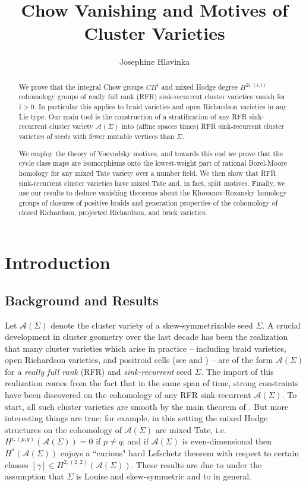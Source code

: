 \documentclass[11pt]{amsart}
\title{Chow Vanishing and Motives of Cluster Varieties}
\author{Josephine Hlavinka}
\theoremstyle{definition}
\theoremstyle{remark}
\numberwithin{equation}{section}
\begin{document}
    \begin{abstract}
    We prove that the integral Chow groups $CH^i$ and mixed Hodge degree $H^{2i, (i, i)}$ cohomology groups of really full rank (RFR) sink-recurrent cluster varieties vanish for $i > 0$. In particular this applies to braid varieties and open Richardson varieties in any Lie type. Our main tool is the construction of a stratification of any RFR sink-recurrent cluster variety $\mathcal{A}(\Sigma)$ into (affine spaces times) RFR sink-recurrent cluster varieties of seeds with fewer mutable vertices than $\Sigma$.
    
    We employ the theory of Voevodsky motives, and towards this end we prove that the cycle class maps are isomorphisms onto the lowest-weight part of rational Borel-Moore homology for any mixed Tate variety over a number field. We then show that RFR sink-recurrent cluster varieties have mixed Tate and, in fact, split motives. Finally, we use our results to deduce vanishing theorems about the Khovanov-Rozansky homology groups of closures of positive braids and generation properties of the cohomology of closed Richardson, projected Richardson, and brick varieties.
\end{abstract}
\maketitle
\tableofcontents
\bigskip
\section{Introduction}

\subsection{Background and Results}

Let $\mathcal{A}(\Sigma)$ denote the cluster variety of a skew-symmetrizable seed $\Sigma$. A crucial development in cluster geometry over the last decade has been the realization that many cluster varieties which arise in practice -- including braid varieties, open Richardson varieties, and positroid cells (see \cite{MR4868947} and \cite{galashin2026braid}) -- are of the form $\mathcal{A}(\Sigma)$ for a \textit{really full rank} (RFR) and \textit{sink-recurrent} seed $\Sigma$. The import of this realization comes from the fact that in the same span of time, strong constraints have been discovered on the cohomology of any RFR sink-recurrent $\mathcal{A}(\Sigma)$. To start, all such cluster varieties are smooth by the main theorem of \cite{muller2013locally}. But more interesting things are true: for example, in this setting the mixed Hodge structures on the cohomology of $\mathcal{A}(\Sigma)$ are mixed Tate, i.e. $H^{i, (p, q)}(\mathcal{A}(\Sigma)) = 0$ if $p \neq q$; and if $\mathcal{A}(\Sigma)$ is even-dimensional then $H^*(\mathcal{A}(\Sigma))$ enjoys a ``curious" hard Lefschetz theorem with respect to certain classes $[\gamma] \in H^{2, (2, 2)}(\mathcal{A}(\Sigma))$. These results are due to \cite{lam2022cohomology} under the assumption that $\Sigma$ is Louise and skew-symmetric and to \cite{galashin2026braid} in general.\\
\end{document}
